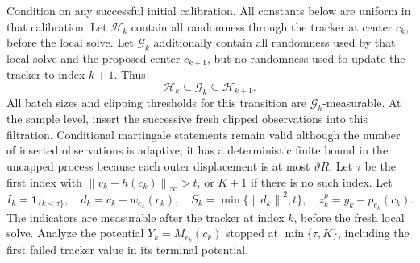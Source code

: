 \documentclass[11pt,a4paper]{article}
\newcommand{\ind}{\mathbf 1}
\newcommand{\norm}[1]{\left\lVert#1\right\rVert}
\theoremstyle{remark}
\numberwithin{equation}{section}
\begin{document}
Condition on any successful initial calibration. All constants below are uniform in that calibration.
Let $\mathcal H_k$ contain all randomness through the tracker at center $c_k$, before the local solve. Let $\mathcal G_k$ additionally contain all randomness used by that local solve and the proposed center $c_{k+1}$, but no randomness used to update the tracker to index $k+1$. Thus
\[
 \mathcal H_k\subseteq\mathcal G_k\subseteq\mathcal H_{k+1}.
\]
All batch sizes and clipping thresholds for this transition are $\mathcal G_k$-measurable. At the sample level, insert the successive fresh clipped observations into this filtration. Conditional martingale statements remain valid although the number of inserted observations is adaptive; it has a deterministic finite bound in the uncapped process because each outer displacement is at most $\vartheta R$. Let $\tau$ be the first index with $\norm{v_k-h(c_k)}_\infty>t$, or $K+1$ if there is no such index. Let
\[
 I_k=\ind_{\{k<\tau\}},\quad
 d_k=c_k-w_{e_k}(c_k),\quad
 S_k=\min\{\norm{d_k}^2,t\},\quad
 z_k^p=y_k-p_{e_k}(c_k).
\]
The indicators are measurable after the tracker at index $k$, before the fresh local solve. Analyze the potential $Y_k=M_{e_k}(c_k)$ stopped at $\min\{\tau,K\}$, including the first failed tracker value in its terminal potential.
\end{document}
